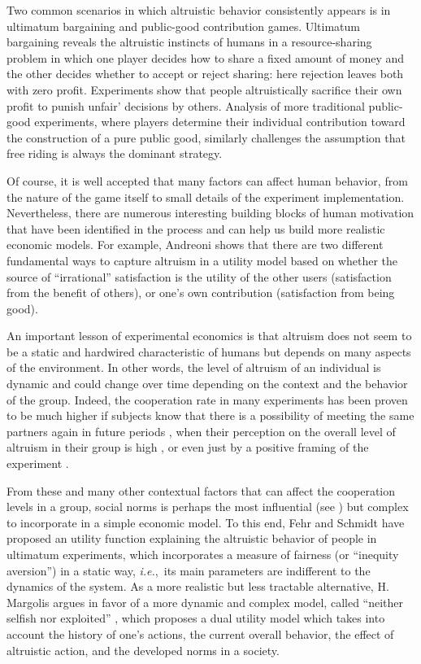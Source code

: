 \documentclass[12pt,onecolumn,draftcls]{IEEEtran}
\newcommand{\ie}{{\em i.e.},~}
\begin{document}
Two common scenarios in which altruistic behavior consistently
appears is in ultimatum bargaining and public-good contribution games.  
Ultimatum bargaining reveals the altruistic
instincts of humans in a resource-sharing problem in which one player
decides how to share a fixed amount of money and the other decides whether
to accept or reject sharing: here rejection leaves both with zero profit.
Experiments show that people altruistically sacrifice their own profit
to punish unfair' decisions by others. 
Analysis of more traditional public-good experiments,
where players determine their individual contribution toward the
construction of a pure public good, similarly challenges the 
assumption that free riding is always the dominant strategy. 

Of course, it is well accepted that many factors can affect human behavior, 
from the nature of the game itself to small details of the experiment 
implementation.
Nevertheless, there are numerous interesting building blocks of human
motivation that have been identified in the process and can help us 
build more realistic economic models.
For example, Andreoni \cite{andreoni_warm_glow} shows that there are
two different fundamental ways to capture altruism in a 
utility model based on whether the source of ``irrational'' 
satisfaction is the utility of the other users (satisfaction from the
benefit of others), or one's own contribution (satisfaction from being good).  


An important lesson of experimental economics 
is that altruism does not seem to be a static and hardwired 
characteristic of humans but depends on many aspects
of the environment. In other words, the level of altruism of
an individual is dynamic and could change over time depending on
the context and the behavior of the group.
Indeed, the cooperation rate 
in many experiments has been proven to be much higher if subjects 
know that there is a possibility of meeting the same partners 
again in future periods \cite{fehr_nature}, when their perception 
on the overall level of altruism in their group is high
\cite{bicchieri_experiments}, or even just by a
positive framing of the experiment \cite{andreoni_framing}.

From these and many other contextual factors that can affect the
cooperation levels in a group, social norms is perhaps the most 
influential (see \cite{ostrom_norms, bicchieri_norms}) 
but complex to incorporate in a simple economic model.
To this end, Fehr and Schmidt \cite{fehr_inequity} have proposed an
utility function explaining the altruistic behavior of people in
ultimatum experiments, which incorporates a measure of fairness (or 
``inequity aversion'') in a static way, \ie its
main parameters are indifferent to the dynamics of the 
system.
As a more realistic but less tractable alternative, H. Margolis 
argues in favor of a more dynamic and complex model, 
called ``neither selfish nor exploited'' \cite{margolis07}, which proposes 
a dual utility model which takes into account the history of one's actions, 
the current overall behavior, the effect of altruistic action, and the 
developed norms in a society.
\end{document}
